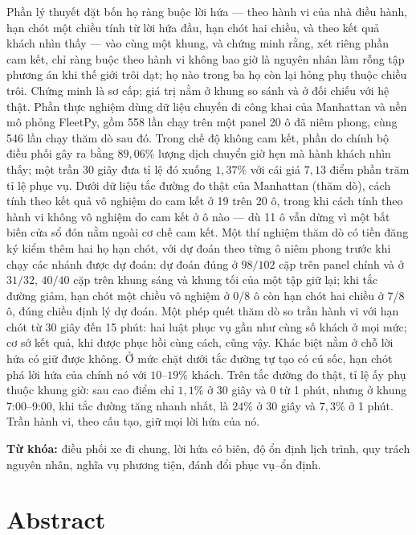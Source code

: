 Phần lý thuyết đặt bốn họ ràng buộc lời hứa --- theo hành vi của nhà điều hành, hạn chót một
chiều tính từ lời hứa đầu, hạn chót hai chiều, và theo kết quả khách nhìn thấy --- vào cùng một
khung, và chứng minh rằng, xét riêng phần cam kết, chỉ ràng buộc theo hành vi không bao giờ là
nguyên nhân làm rỗng tập phương án khi thế giới trôi dạt; họ nào trong ba họ còn lại hỏng phụ
thuộc chiều trôi. Chứng minh là sơ cấp; giá trị nằm ở khung so sánh và ở đối chiếu với hệ thật.
Phần thực nghiệm dùng dữ liệu chuyến đi công khai của Manhattan và nền mô phỏng FleetPy, gồm 558
lần chạy trên một panel 20 ô đã niêm phong, cùng 546 lần chạy thăm dò sau đó. Trong chế độ không cam kết, phần do
chính bộ điều phối gây ra bằng $89{,}06\%$ lượng dịch chuyển giờ hẹn mà hành khách nhìn thấy; một
trần 30 giây đưa tỉ lệ đó xuống $1{,}37\%$ với cái giá $7{,}13$ điểm phần trăm tỉ lệ phục vụ. Dưới
dữ liệu tắc đường đo thật của Manhattan (thăm dò), cách tính theo kết quả vô nghiệm do cam kết ở
19 trên 20 ô, trong khi cách tính theo hành vi không vô nghiệm do cam kết ở ô nào --- dù 11 ô vẫn
dừng vì một bất biến cửa sổ đón nằm ngoài cơ chế cam kết. Một thí nghiệm thăm dò có tiền đăng ký
kiểm thêm hai họ hạn chót, với dự đoán theo từng ô niêm phong trước khi chạy các nhánh được dự
đoán: dự đoán đúng ở
$98/102$ cặp trên panel chính và ở $31/32$, $40/40$ cặp trên khung sáng và khung tối của một tập giữ
lại; khi tắc đường giảm, hạn chót một chiều vô nghiệm ở 0/8 ô còn hạn chót hai chiều ở 7/8 ô, đúng
chiều định lý dự đoán. Một phép quét thăm dò so trần hành vi với hạn chót từ 30 giây đến 15 phút:
hai luật phục vụ gần như cùng số khách ở mọi mức; cơ sở kết quả, khi được phục hồi cùng cách, cũng vậy.
Khác biệt nằm ở chỗ lời hứa có giữ được không. Ở mức chặt dưới tắc đường tự tạo có cú sốc, hạn chót phá
lời hứa của chính nó với $10$--$19\%$ khách. Trên tắc đường đo thật, tỉ lệ ấy phụ thuộc khung giờ: sau cao
điểm chỉ $1{,}1\%$ ở 30 giây và 0 từ 1 phút, nhưng ở khung 7:00--9:00, khi tắc đường tăng nhanh nhất, là
$24\%$ ở 30 giây và $7{,}3\%$ ở 1 phút. Trần hành vi, theo cấu tạo, giữ mọi lời hứa của nó.

\vspace{6pt}
\noindent\textbf{Từ khóa:} điều phối xe đi chung, lời hứa có biên, độ ổn định lịch trình,
quy trách nguyên nhân, nghĩa vụ phương tiện, đánh đổi phục vụ--ổn định.

\clearpage

\chapter*{Abstract}


